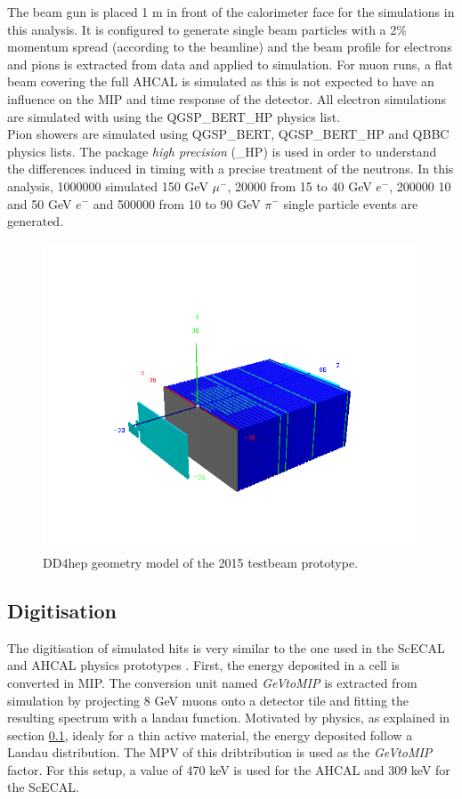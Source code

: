 The beam gun is placed 1 m in front of the calorimeter face for the simulations in this analysis. It is configured to generate single beam particles with a 2\% momentum spread (according to the beamline) and the beam profile for electrons and pions is extracted from data and applied to simulation. For muon runs, a flat beam covering the full AHCAL is simulated as this is not expected to have an influence on the MIP and time response of the detector. All electron simulations are simulated with  using the QGSP\_BERT\_HP physics list.\\

Pion showers are simulated using QGSP\_BERT, QGSP\_BERT\_HP and QBBC physics lists. The package \textit{high precision} (\_HP) is used in order to understand the differences induced in timing with a precise treatment of the neutrons. In this analysis, 1000000 simulated 150 GeV $\mu^-$, 20000 from 15 to 40 GeV $e^-$, 200000 10 and 50 GeV $e^-$ and 500000 from 10 to 90 GeV $\pi^-$ single particle events are generated.

\begin{figure}[htbp!]
  \centering
  \includegraphics[width=0.7\linewidth]{chap4/fig/DD4hep_AHCALModel.png}
  \caption{DD4hep geometry model of the 2015 testbeam prototype.} \label{fig:GeomModel}
\end{figure}

\subsection{Digitisation}

The digitisation of simulated hits is very similar to the one used in the ScECAL and AHCAL physics prototypes \cite{2011_JINST_6_P04003}. First, the energy deposited in a cell is converted in MIP. The conversion unit named \textit{GeVtoMIP} is extracted from simulation by projecting 8 GeV muons onto a detector tile and fitting the resulting spectrum with a landau function. Motivated by physics, as explained in section \ref{}, idealy for a thin active material, the energy deposited follow a Landau distribution. The MPV of this dribtribution is used as the \textit{GeVtoMIP} factor. For this setup, a value of 470 keV is used for the AHCAL and 309 keV for the ScECAL.\\

